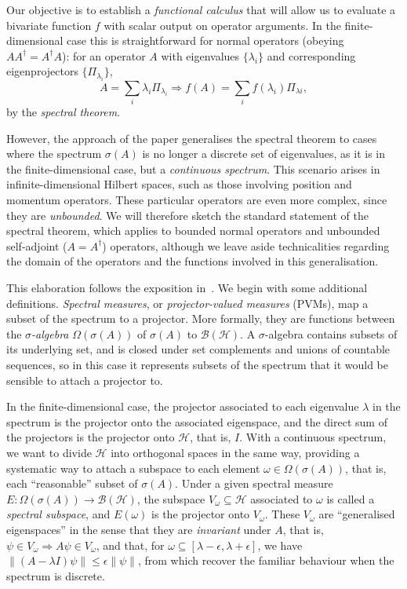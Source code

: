 \documentclass[10pt, a4paper]{article}
\numberwithin{equation}{section} %
\theoremstyle{definition}
\theoremstyle{plain}
\newcommand{\norm}[1]{\left\lVert#1\right\rVert}
\newcommand{\?}{\mathrel{?}} %
\newcommand{\Hs}{\mathcal{H}} %
\begin{document}
\begin{appendices}
      Our objective is to establish a \emph{functional calculus} that will allow us to evaluate a bivariate function  \(f\) with scalar output on operator arguments. In the finite-dimensional case this is straightforward for normal operators (obeying \(AA^{\dagger} = A^{\dagger}A\)): for an operator \(A\) with eigenvalues \(\{\lambda_i\}\) and corresponding eigenprojectors \(\{\Pi_{\lambda_i}\}\),
      \[ A = \sum_i \lambda_i \Pi_{\lambda_i} \Rightarrow f(A) = \sum_i f(\lambda_{i}) \Pi_{\lambda{i}}, \]
      by the \emph{spectral theorem}.

      However, the approach of the paper generalises the spectral theorem to cases where the spectrum \(\sigma(A)\) is no longer a discrete set of eigenvalues, as it is in the finite-dimensional case, but a \emph{continuous spectrum}. This scenario arises in infinite-dimensional Hilbert spaces, such as those involving position and momentum operators. These particular operators are even more complex, since they are \emph{unbounded}. We will therefore sketch the standard statement of the spectral theorem, which applies to bounded normal operators and unbounded self-adjoint (\(A = A^{\dagger}\)) operators, although we leave aside technicalities regarding the domain of the operators and the functions involved in this generalisation.

      This elaboration follows the exposition in~\cite{HallQuantumForMath}. We begin with some additional definitions. \emph{Spectral measures}, or \emph{projector-valued measures} (PVMs), map a subset of the spectrum to a projector. More formally, they are functions between the \emph{\(\sigma\)-algebra} \(\Omega(\sigma(A))\) of \(\sigma(A)\) to \(\mathcal{B}(\Hs)\). A \(\sigma\)-algebra contains subsets of its underlying set, and is closed under set complements and unions of countable sequences, so in this case it represents subsets of the spectrum that it would be sensible to attach a projector to.

      In the finite-dimensional case, the projector associated to each eigenvalue \(\lambda\) in the spectrum is the projector onto the associated eigenspace, and the direct sum of the projectors is the projector onto \(\Hs\), that is, \(I\). With a continuous spectrum, we want to divide \(\Hs\) into orthogonal spaces in the same way, providing a systematic way to attach a subspace to each element \(\omega \in \Omega(\sigma(A))\), that is, each ``reasonable'' subset of \(\sigma(A)\). Under a given spectral measure \(E : \Omega(\sigma(A)) \to \mathcal{B}(\Hs)\), the subspace \(V_{\omega} \subseteq \Hs\) associated to \(\omega\) is called a \emph{spectral subspace}, and \(E(\omega)\) is the projector onto \(V_{\omega}\). These \(V_{\omega}\) are ``generalised eigenspaces'' in the sense that they are \emph{invariant} under \(A\), that is, \(\psi \in V_{\omega} \Rightarrow A\psi \in V_{\omega}\), and that, for \(\omega \subseteq [\lambda - \epsilon, \lambda + \epsilon]\), we have \(\norm{(A - \lambda I)\psi} \leq \epsilon\norm{\psi}\), from which recover the familiar behaviour when the spectrum is discrete.


\end{appendices}
\end{document}

